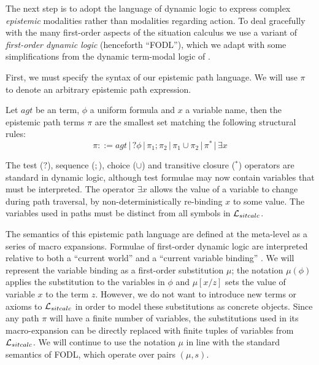 The next step is to adopt the language of dynamic logic to express
complex \emph{epistemic} modalities rather than modalities regarding
action. To deal gracefully with the many first-order aspects of the
situation calculus we use a variant of \emph{first-order dynamic logic}
(henceforth {}``FODL''), which we adapt with some simplifications
from the dynamic term-modal logic of \citet{kooi07dyn_termmodal_logic}.

First, we must specify the syntax of our epistemic path language.
We will use $\pi$ to denote an arbitrary epistemic path expression.

\newpage{}

\begin{defnL}
 Let $agt$ be an term, $\phi$
a uniform formula and $x$ a variable name, then the epistemic path
terms $\pi$ are the smallest set matching the following structural
rules:\[
\pi::=agt\,|\,?\phi\,|\,\pi_{1};\pi_{2}\,|\,\pi_{1}\cup\pi_{2}\,|\,\pi^{*}\,|\,\exists x\]

\end{defnL}
The test ($?$), sequence ($;$), choice ($\cup$) and transitive
closure ($^{*}$) operators are standard in dynamic logic, although
test formulae may now contain variables that must be interpreted.
The operator $\exists x$ allows the value of a variable to change
during path traversal, by non-deterministically re-binding $x$ to
some value. The variables used in paths must be distinct from all
symbols in $\mathcal{L}_{sitcalc}$.

The semantics of this epistemic path language are defined at the meta-level
as a series of macro expansions. Formulae of first-order dynamic logic
are interpreted relative to both a {}``current world'' and a {}``current
variable binding'' \citep{kooi07dyn_termmodal_logic}. We will represent
the variable binding as a first-order substitution $\mu$; the notation
$\mu(\phi)$ applies the substitution to the variables in $\phi$
and $\mu[x/z]$ sets the value of variable $x$ to the term $z$.
However, we do not want to introduce new terms or axioms to $\mathcal{L}_{sitcalc}$
in order to model these substitutions as concrete objects. Since any
path $\pi$ will have a finite number of variables, the substitutions
used in its macro-expansion can be directly replaced with finite tuples
of variables from $\mathcal{L}_{sitcalc}$. We will continue to use the notation $\mu$
in line with the standard semantics of FODL, which operate over pairs
$(\mu,s)$.


